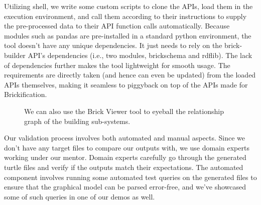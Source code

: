 \documentclass[twocolumn, switch]{article} %
\begin{document}
	Utilizing shell, we write some custom scripts to clone the APIs, load them in the execution environment, and call them according to their instructions to supply the pre-processed data to their API function calls automatically.  
	Because modules such as pandas are pre-installed in a standard python environment, the tool doesn’t have any unique dependencies. It just needs to rely on the brick-builder API’s dependencies (i.e., two modules, brickschema and rdflib). The lack of dependencies further makes the tool lightweight for smooth usage. The requirements are directly taken (and hence can even be updated) from the loaded APIs themselves, making it seamless to piggyback on top of the APIs made for Brickification.

\begin{figure}[H]
  \centering
  \caption{We can also use the Brick Viewer tool
  \cite{brick_ttl_viewer} to eyeball the relationship graph of the building sub-systems.}
  \label{fig:fig3}
\end{figure}


Our validation process involves both automated and manual aspects. Since we don't have any target files to compare our outputs with, we use domain experts working under our mentor. Domain experts carefully go through the generated turtle files and verify if the outputs match their expectations. The automated component involves running some automated test queries on the generated files to ensure that the graphical model can be parsed error-free, and we’ve showcased some of such queries in one of our demos as well.
\end{document}
